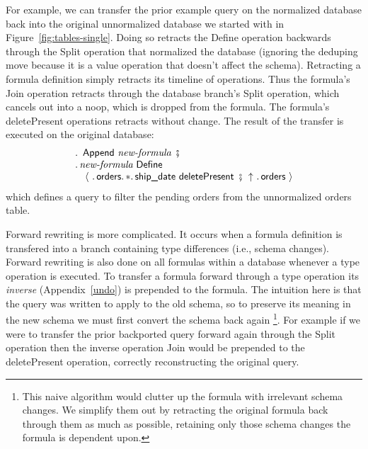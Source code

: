 \documentclass[english,submission]{programming}
\theoremstyle{definition}
\DeclareMathOperator{\exec}{\ \fatsemi\ \ }
\begin{document}
For example, we can transfer the prior example query on the normalized database back into the original unnormalized database we started with in Figure~\ref{fig:tables-single}. Doing so retracts the \textsf{Define} operation backwards through the \textsf{Split} operation that normalized the database (ignoring the deduping \textsf{move} because it is a value operation that doesn't affect the schema). Retracting a formula definition simply retracts its timeline of operations. Thus the formula's \textsf{Join} operation retracts through the database branch's \textsf{Split} operation, which cancels out into a \textsf{noop}, which is dropped from the formula. The formula's \textsf{deletePresent} operations retracts without change. The result of the transfer is executed on the original database:
\[
\begin{array}{l}
  \ldotp \textsf{ Append } \textit{new-formula} \exec\\
  \ldotp \textit{new-formula} \textsf{ Define } \\
  \quad \langle
\ \ldotp \textsf{orders}\ldotp * \ldotp \textsf{ship\_date deletePresent} \exec
\!\!\uparrow \ \ldotp \textsf{orders}\
  \rangle\\
\end{array}
\]
which defines a query to filter the pending orders from the unnormalized orders table.

Forward rewriting is more complicated. It occurs when a formula definition is transfered into a branch containing type differences (i.e., schema changes). Forward rewriting is also done on all formulas within a database whenever a type operation is executed. To transfer a formula forward through a type operation its \textit{inverse} (Appendix~\ref{undo}) is prepended to the formula. The intuition here is that the query was written to apply to the old schema, so to preserve its meaning in the new schema we must first convert the schema back again
\footnote{This naive algorithm would clutter up the formula with irrelevant schema changes. We simplify them out by retracting the original formula back through them as much as possible, retaining only those schema changes the formula is dependent upon.}.
For example if we were to transfer the prior backported query forward again through the \textsf{Split} operation then the inverse operation \textsf{Join} would be prepended to the \textsf{deletePresent} operation, correctly reconstructing the original query.


\end{document}
